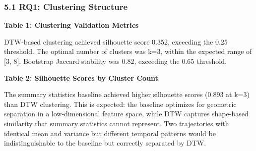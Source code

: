 
\subsubsection{5.1 RQ1: Clustering Structure}

\textbf{Table 1: Clustering Validation Metrics}

\begin{table}[htbp]
\centering
{}
\end{table}

DTW-based clustering achieved silhouette score 0.352, exceeding the 0.25 threshold. The optimal number of clusters was k=3, within the expected range of [3, 8]. Bootstrap Jaccard stability was 0.82, exceeding the 0.65 threshold.

\textbf{Table 2: Silhouette Scores by Cluster Count}

\begin{table}[htbp]
\centering
{}
\end{table}

The summary statistics baseline achieved higher silhouette scores (0.893 at k=3) than DTW clustering. This is expected: the baseline optimizes for geometric separation in a low-dimensional feature space, while DTW captures shape-based similarity that summary statistics cannot represent. Two trajectories with identical mean and variance but different temporal patterns would be indistinguishable to the baseline but correctly separated by DTW.

